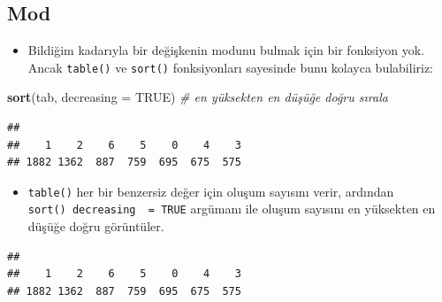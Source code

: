 \documentclass[
  oneside]{book}
\newenvironment{Shaded}{\begin{snugshade}}{\end{snugshade}}
\newcommand{\AttributeTok}[1]{\textcolor[rgb]{0.13,0.29,0.53}{#1}}
\newcommand{\CommentTok}[1]{\textcolor[rgb]{0.56,0.35,0.01}{\textit{#1}}}
\newcommand{\ConstantTok}[1]{\textcolor[rgb]{0.56,0.35,0.01}{#1}}
\newcommand{\FunctionTok}[1]{\textcolor[rgb]{0.13,0.29,0.53}{\textbf{#1}}}
\newcommand{\NormalTok}[1]{#1}
\newcommand{\OtherTok}[1]{\textcolor[rgb]{0.56,0.35,0.01}{#1}}
\newcommand{\SpecialCharTok}[1]{\textcolor[rgb]{0.81,0.36,0.00}{\textbf{#1}}}
\providecommand{\tightlist}{%
  \setlength{\itemsep}{0pt}\setlength{\parskip}{0pt}}
\begin{document}
\hypertarget{mod}{%
\subsection{Mod}\label{mod}}

\begin{itemize}
\tightlist
\item
  Bildiğim kadarıyla bir değişkenin modunu bulmak için bir fonksiyon yok. Ancak \texttt{table()} ve \texttt{sort()} fonksiyonları sayesinde bunu kolayca bulabiliriz:
\end{itemize}

\begin{Shaded}
\end{Shaded}

\begin{Shaded}
\begin{Highlighting}[]
\FunctionTok{sort}\NormalTok{(tab, }\AttributeTok{decreasing =} \ConstantTok{TRUE}\NormalTok{) }\CommentTok{\# en yüksekten en düşüğe doğru sırala}
\end{Highlighting}
\end{Shaded}

\begin{verbatim}
## 
##    1    2    6    5    0    4    3 
## 1882 1362  887  759  695  675  575
\end{verbatim}

\begin{itemize}
\tightlist
\item
  \texttt{table()} her bir benzersiz değer için oluşum sayısını verir, ardından \texttt{sort()\ decreasing\ \ =\ TRUE} argümanı ile oluşum sayısını en yüksekten en düşüğe doğru görüntüler.
\end{itemize}

\begin{Shaded}
\end{Shaded}

\begin{verbatim}
## 
##    1    2    6    5    0    4    3 
## 1882 1362  887  759  695  675  575
\end{verbatim}
\end{document}
